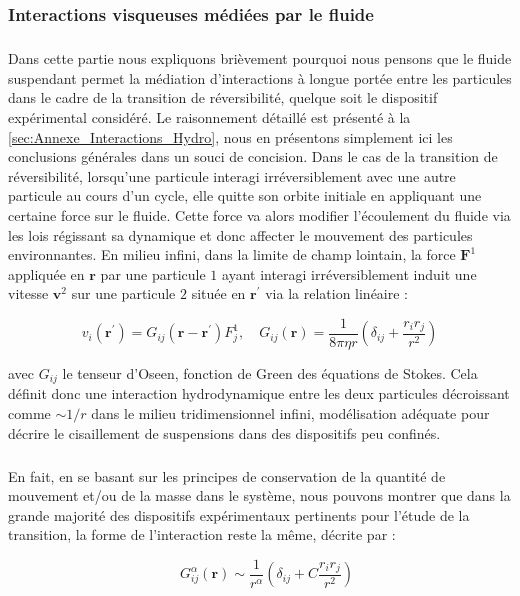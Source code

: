 \subsubsection{Interactions visqueuses médiées par le fluide}

\label{sec:ref_interac_visc}

\subparagraph{}Dans cette partie nous expliquons brièvement pourquoi nous pensons que le fluide suspendant permet la médiation d'interactions à longue portée entre les particules dans le cadre de la transition de réversibilité, quelque soit le dispositif expérimental considéré. Le raisonnement détaillé est présenté à la \autoref{sec:Annexe_Interactions_Hydro}, nous en présentons simplement ici les conclusions générales dans un souci de concision. Dans le cas de la transition de réversibilité, lorsqu'une particule interagi irréversiblement avec une autre particule au cours d'un cycle, elle quitte son orbite initiale en appliquant une certaine force sur le fluide. Cette force va alors modifier l'écoulement du fluide via les lois régissant sa dynamique et donc affecter le mouvement des particules environnantes. En milieu infini, dans la limite de champ lointain, la force $\mathbf{F}^1$ appliquée en $\mathbf{r}$ par une particule $1$ ayant interagi irréversiblement induit une vitesse $\mathbf{v}^2$ sur une particule $2$ située en $\mathbf{r}^\prime$ via la relation linéaire :

\begin{equation}
	v_i (\mathbf{r}^\prime) = G_{ij}(\mathbf{r} -\mathbf{r}^\prime)F^1_j, \quad G_{ij}(\mathbf{r}) = \frac{1}{8\pi\eta r}\left( \delta_{ij}+\frac{r_ir_j}{r^2} \right)
\end{equation}

\noindent avec $G_{ij}$ le tenseur d'Oseen, fonction de Green des équations de Stokes. Cela définit donc une interaction hydrodynamique entre les deux particules décroissant comme $\sim 1/r$ dans le milieu tridimensionnel infini, modélisation adéquate pour décrire le cisaillement de suspensions dans des dispositifs peu confinés.

\subparagraph{}En fait, en se basant sur les principes de conservation de la quantité de mouvement et/ou de la masse dans le système, nous pouvons montrer que dans la grande majorité des dispositifs expérimentaux pertinents pour l'étude de la transition, la forme de l'interaction reste la même, décrite par :

\begin{equation}
\quad G^\alpha_{ij}(\mathbf{r}) \sim \frac{1}{r^\alpha}\left( \delta_{ij}+ C\frac{r_ir_j}{r^2} \right)
\end{equation}

